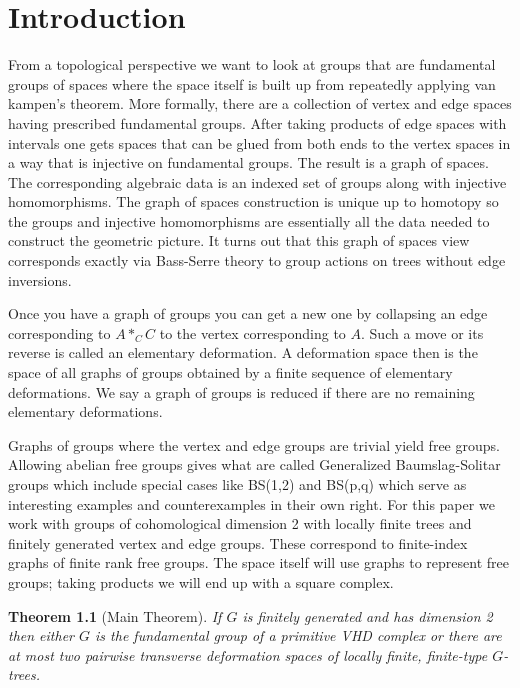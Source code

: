 \documentclass[12pt,parskip=full]{report}
\theoremstyle{plain}
\newtheorem{thm}{Theorem}[section]
\theoremstyle{definition}
\begin{document}


\chapter{Introduction}

From a topological perspective we want to look at groups that are fundamental groups of spaces where the space itself is built up from repeatedly applying van kampen's theorem. More formally, there are a collection of vertex and edge spaces having prescribed fundamental groups. After taking products of edge spaces with intervals one gets spaces that can be glued from both ends to the vertex spaces in a way that is injective on fundamental groups. The result is a graph of spaces. The corresponding algebraic data is an indexed set of groups along with injective homomorphisms. The graph of spaces construction is unique up to homotopy so the groups and injective homomorphisms are essentially all the data needed to construct the geometric picture. It turns out that this graph of spaces view corresponds exactly via Bass-Serre theory to group actions on trees without edge inversions.

Once you have a graph of groups you can get a new one by collapsing an edge corresponding to \(A*_CC\) to the vertex corresponding to \(A\). Such a move or its reverse is called an elementary deformation. A deformation space then is the space of all graphs of groups obtained by a finite sequence of elementary deformations. We say a graph of groups is reduced if there are no remaining elementary deformations.

Graphs of groups where the vertex and edge groups are trivial yield free groups. Allowing abelian free groups gives what are called Generalized Baumslag-Solitar groups which include special cases like BS(1,2) and BS(p,q) which serve as interesting examples and counterexamples in their own right. For this paper we work with groups of cohomological dimension 2 with locally finite trees and finitely generated vertex and edge groups. These correspond to finite-index graphs of finite rank free groups. The space itself will use graphs to represent free groups; taking products we will end up with a square complex.

\begin{thm}
    [Main Theorem]
    \label{thm:martino}
    If \(G\) is finitely generated and has dimension 2 then either \(G\) is the fundamental group of a primitive VHD complex or there are at most two pairwise transverse deformation spaces of locally finite, finite-type \(G\)-trees.
\end{thm}
\end{document}
